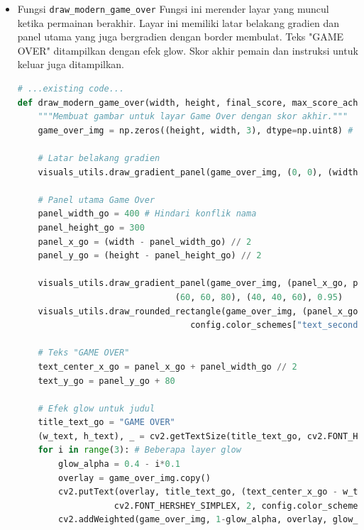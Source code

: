 \documentclass[11pt,a4paper]{article}
\begin{document}
\begin{itemize}
\begin{itemize}
\begin{lstlisting}[language=Python, caption=Fungsi add\_ball_\trail dan draw\_ball\_trail]
            pt1 = config.ball_trail[i-1]
            pt2 = config.ball_trail[i]
            
            start_point = (int(pt1[0]), int(pt1[1]))
            end_point = (int(pt2[0]), int(pt2[1]))
            
            cv2.line(img, start_point, end_point, current_trail_color, thickness_trail)
# ...existing code...
\end{lstlisting}
\item Fungsi \texttt{draw\_modern\_game\_over}
\newline Fungsi ini merender layar yang muncul ketika permainan berakhir. Layar ini memiliki latar belakang gradien dan panel utama yang juga bergradien dengan border membulat. Teks "GAME OVER" ditampilkan dengan efek glow. Skor akhir pemain dan instruksi untuk keluar juga ditampilkan.
\begin{lstlisting}[language=Python, caption=Fungsi draw\_modern\_game\_over]
# ...existing code...
def draw_modern_game_over(width, height, final_score, max_score_achieved):
    """Membuat gambar untuk layar Game Over dengan skor akhir."""
    game_over_img = np.zeros((height, width, 3), dtype=np.uint8) # Latar belakang hitam
    
    # Latar belakang gradien
    visuals_utils.draw_gradient_panel(game_over_img, (0, 0), (width, height), (20, 20, 30), (40, 40, 60), 1.0)
    
    # Panel utama Game Over
    panel_width_go = 400 # Hindari konflik nama
    panel_height_go = 300
    panel_x_go = (width - panel_width_go) // 2
    panel_y_go = (height - panel_height_go) // 2
    
    visuals_utils.draw_gradient_panel(game_over_img, (panel_x_go, panel_y_go), (panel_x_go + panel_width_go, panel_y_go + panel_height_go), 
                               (60, 60, 80), (40, 40, 60), 0.95)
    visuals_utils.draw_rounded_rectangle(game_over_img, (panel_x_go, panel_y_go), (panel_x_go + panel_width_go, panel_y_go + panel_height_go), 
                                  config.color_schemes["text_secondary"], 3, 15)
    
    # Teks "GAME OVER"
    text_center_x_go = panel_x_go + panel_width_go // 2
    text_y_go = panel_y_go + 80
    
    # Efek glow untuk judul
    title_text_go = "GAME OVER"
    (w_text, h_text), _ = cv2.getTextSize(title_text_go, cv2.FONT_HERSHEY_SIMPLEX, 2, 3)
    for i in range(3): # Beberapa layer glow
        glow_alpha = 0.4 - i*0.1
        overlay = game_over_img.copy()
        cv2.putText(overlay, title_text_go, (text_center_x_go - w_text//2, text_y_go), 
                   cv2.FONT_HERSHEY_SIMPLEX, 2, config.color_schemes["danger"], 5 + i*2) # Glow lebih tebal
        cv2.addWeighted(game_over_img, 1-glow_alpha, overlay, glow_alpha, 0, game_over_img)


\end{lstlisting}
\end{itemize}
\end{itemize}
\end{document}

